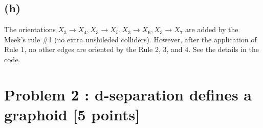 \documentclass[10pt]{article}
\begin{document}
\subsection*{(h)}

The orientations $X_3 \rightarrow X_4, X_3 \rightarrow X_5, X_3 \rightarrow X_6, X_3 \rightarrow X_7$ are added by the Meek's rule \#1 (no extra unshileded colliders).
However, after the application of Rule 1, no other edges are oriented by the Rule 2, 3, and 4. See the details in the code.

\section{Problem 2 : d-separation defines a graphoid [5 points]}
\end{document}
